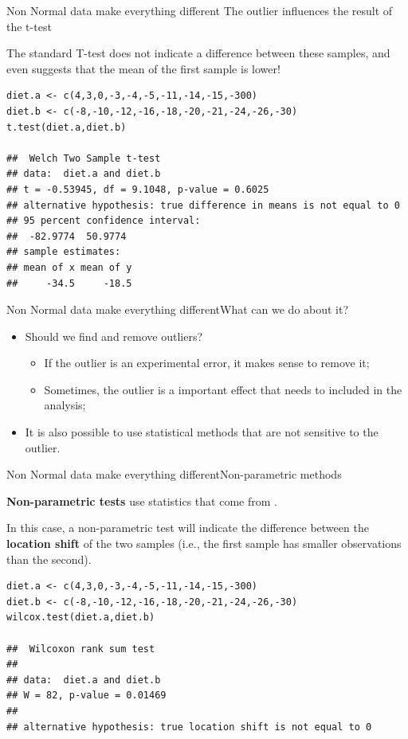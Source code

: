 \begin{frame}[fragile]{Non Normal data make everything different}
  {The outlier influences the result of the t-test}

The standard T-test does not indicate a difference between these samples,
and even suggests that the mean of the first sample is lower!\bigskip

{\smaller
\begin{verbatim}
diet.a <- c(4,3,0,-3,-4,-5,-11,-14,-15,-300)
diet.b <- c(-8,-10,-12,-16,-18,-20,-21,-24,-26,-30)
t.test(diet.a,diet.b)

##  Welch Two Sample t-test
## data:  diet.a and diet.b
## t = -0.53945, df = 9.1048, p-value = 0.6025
## alternative hypothesis: true difference in means is not equal to 0
## 95 percent confidence interval:
##  -82.9774  50.9774
## sample estimates:
## mean of x mean of y
##     -34.5     -18.5
\end{verbatim}}
\end{frame}


\begin{frame}{Non Normal data make everything different}{What can we do about it?}

  \begin{itemize}
    \item Should we find and remove outliers?
    \begin{itemize}
      \item If the outlier is an experimental error, it makes sense to remove it;
      \item Sometimes, the outlier is a important effect that needs to included in the analysis;
    \end{itemize}
    \bigskip

    \item It is also possible to use statistical methods that are not sensitive to the outlier.
  \end{itemize}

\end{frame}


\begin{frame}[fragile]{Non Normal data make everything different}{Non-parametric methods}

{\bf Non-parametric tests} use statistics that come from .
\bigskip

In this case, a non-parametric test will indicate the difference between the {\bf location shift} of the two samples (i.e., the first sample has smaller observations than the second).

{\small
\begin{verbatim}
diet.a <- c(4,3,0,-3,-4,-5,-11,-14,-15,-300)
diet.b <- c(-8,-10,-12,-16,-18,-20,-21,-24,-26,-30)
wilcox.test(diet.a,diet.b)

##  Wilcoxon rank sum test
##
## data:  diet.a and diet.b
## W = 82, p-value = 0.01469
##
## alternative hypothesis: true location shift is not equal to 0
\end{verbatim}}
\end{frame}

